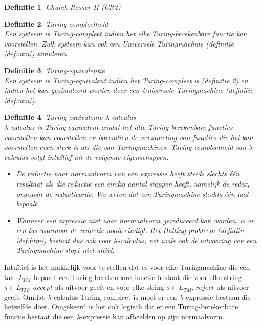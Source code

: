 \documentclass[a4paper]{article}
\newtheorem{tdefinitie}{Definitie}[section]
\newenvironment{definitie}[1]%
  {\begin{mdframed}[backgroundcolor=silver,
    topline=false,
    rightline=false,
    leftline=false,
    bottomline=false]\begin{tdefinitie}#1\\\normalfont}%
  {\end{tdefinitie}\end{mdframed}}
\begin{document}
\begin{definitie}{Church-Rosser II (CR2)}
  
\end{definitie}

\begin{definitie}{Turing-compleetheid}
  \label{def:tmcompleet}
  Een systeem is Turing-compleet indien het elke Turing-berekenbare functie kan voorstellen. Zulk systeem kan ook een Universele Turingmachine (definitie \ref{def:utm}) simuleren.
\end{definitie}

\begin{definitie}{Turing-equivalentie}
  Een systeem is Turing-equivalent indien het Turing-compleet is (definitie \ref{def:tmcompleet}) en indien het kan gesimuleerd worden door een Universele Turingmachine (definitie \ref{def:utm}).
\end{definitie}

\begin{definitie}{Turing-equivalente $\lambda$-calculus}
  \label{def:tmlambda}
  $\lambda$-calculus is Turing-equivalent omdat het alle Turing-berekenbare functies voorstellen kan voorstellen en bovendien de verzameling van functies die het kan voorstellen even sterk is als die van Turingmachines. Turing-compleetheid van $\lambda$-calculus volgt intu\"itief uit de volgende eigenschappen:
  \begin{itemize}
  \item De reductie naar normaalvorm van een expressie heeft steeds slechts \'e\'en resultaat als die reductie een eindig aantal stappen heeft, namelijk de redex, ongeacht de reductieorde. We weten dat een Turingmachine slechts \'e\'en taal bepaalt.
  \item Wanneer een expressie niet naar normaalvorm gereduceerd kan worden, is er een lus waardoor de reductie nooit eindigt. Het Halting-probleem (definitie \ref{def:htm}) bestaat dus ook voor $\lambda$-calculus, net zoals ook de uitvoering van een Turingmachine stopt niet altijd.
  \end{itemize}
\end{definitie}

Intu\"itief is het makkelijk voor te stellen dat er voor elke Turingmachine die een taal $L_{TM}$ bepaalt een Turing-berekenbare functie bestaat die voor elke string $s \in L_{TM}$, $accept$ als uitvoer geeft en voor elke string $s \in \overline{L_{TM}}$, $reject$ als uitvoer geeft. Omdat $\lambda$-calculus Turing-compleet is moet er een $\lambda$-expressie bestaan die hetzelfde doet. Omgekeerd is het ook logisch dat er een Turing-berekenbare functie bestaat die een $\lambda$-expressie kan afbeelden op zijn normaalvorm.
\end{document}
